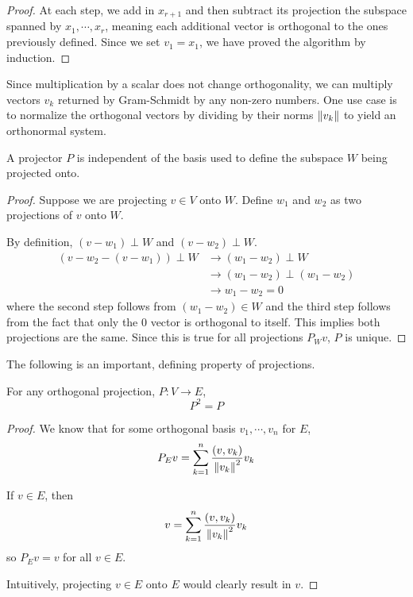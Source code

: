 \begin{proof}
At each step, we add in $x_{r + 1}$ and then subtract its projection the subspace spanned by $x_{1}, \cdots, x_{r}$, meaning each additional vector is orthogonal to the ones previously defined. Since we set $v_{1} = x_{1}$, we have proved the algorithm by induction. 
\end{proof}

Since multiplication by a scalar does not change orthogonality, we can multiply vectors $v_{k}$ returned by Gram-Schmidt by any non-zero numbers. One use case is to normalize the orthogonal vectors by dividing by their norms $\norm{v_{k}}$ to yield an orthonormal system. 


\begin{theorem}
A projector $P$ is independent of the basis used to define the subspace $W$ being projected onto. 
\end{theorem}

\begin{proof}
Suppose we are projecting $v \in V$ onto $W$. Define $w_{1}$ and $w_{2}$ as two projections of $v$ onto $W$. 

By definition, $(v - w_{1}) \perp W$ and $(v - w_{2}) \perp W$. 
$$
\begin{aligned}
(v - w_{2} - (v - w_{1})) \perp W &\rightarrow (w_{1} - w_{2}) \perp W \\
&\rightarrow (w_{1} - w_{2}) \perp (w_{1} - w_{2}) \\
&\rightarrow w_{1} - w_{2} = 0
\end{aligned}
$$
where the second step follows from $(w_{1} - w_{2}) \in W$ and the third step follows from the fact that only the 0 vector is orthogonal to itself. This implies both projections are the same. Since this is true for all projections $P_{W} v$, $P$ is unique. 
\end{proof}

The following is an important, defining property of projections. 

\begin{theorem}
For any orthogonal projection, $P: V \rightarrow E$, $$P^{2} = P$$
\end{theorem}

\begin{proof}
We know that for some orthogonal basis $v_{1}, \cdots, v_{n}$ for $E$, 
$$P_{E} v = \sum_{k=1}^{n} \frac{(v, v_{k})}{\norm{v_{k}}^{2}} v_{k}$$

If $v \in E$, then 
$$v = \sum_{k=1}^{n} \frac{(v, v_{k})}{\norm{v_{k}}^{2}} v_{k}$$
so $P_{E} v = v$ for all $v \in E$. 

Intuitively, projecting $v \in E$ onto $E$ would clearly result in $v$. 
\end{proof}

